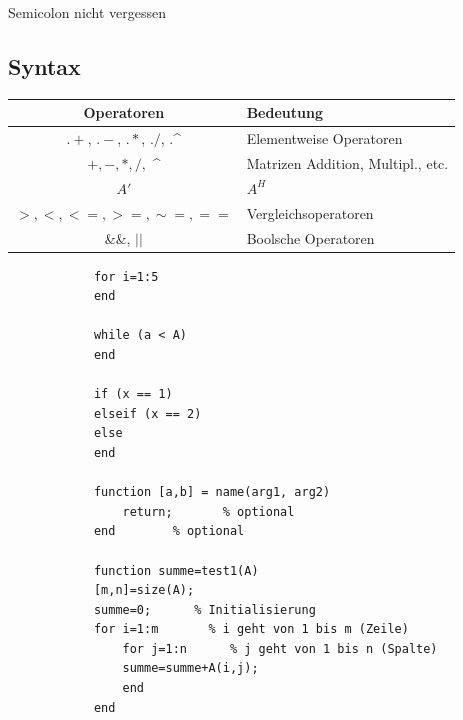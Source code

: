 \documentclass[a4paper,twocolumn]{article}
\begin{document}
\begin{appendix}
	\begin{fdef}[Achtung!]
		Semicolon nicht vergessen
	\end{fdef}

\subsection{Syntax}
	\begin{tabular}{c|l}
		Operatoren										&		Bedeutung		\tabularnewline
		\hline
		$.+$, $.-$, $.*$, $./$, .\textasciicircum{} 	& 	Elementweise Operatoren \tabularnewline
		$+, -, *, /,$ \textasciicircum{} 				& 	Matrizen Addition, Multipl., etc. \tabularnewline
		$A'$											& 	$A^{H}$\tabularnewline
		$>, <, <=, >=, \sim =, ==$ 						& 	Vergleichsoperatoren\tabularnewline
		\&\&, $||$										& 	Boolsche Operatoren\tabularnewline
	\end{tabular}

	\begin{fmerke}
		\begin{verbatim}
			for i=1:5
			end
			
			while (a < A)
			end
	
			if (x == 1)
			elseif (x == 2)
			else
			end
			
			function [a,b] = name(arg1, arg2)
				return;       % optional
			end        % optional
			
			function summe=test1(A)
			[m,n]=size(A);
			summe=0;      % Initialisierung
			for i=1:m       % i geht von 1 bis m (Zeile)
				for j=1:n      % j geht von 1 bis n (Spalte)
				summe=summe+A(i,j);
				end
			end
		\end{verbatim}
		
	\end{fmerke}
	
	
		
\end{appendix}
\end{document}
